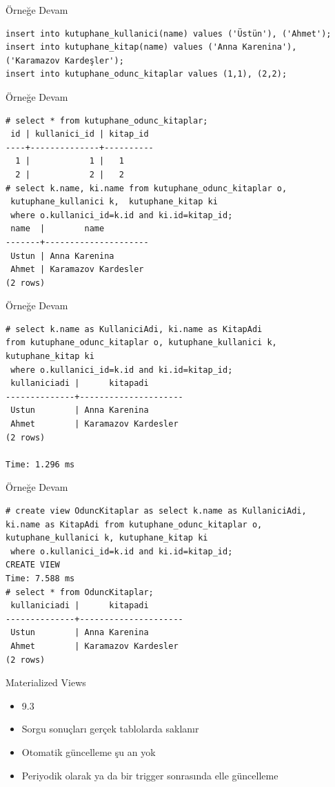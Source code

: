 \documentclass[presentation]{beamer}
\begin{document}
\begin{frame}[fragile,label=sec-32]{Örneğe Devam}
 \begin{verbatim}
insert into kutuphane_kullanici(name) values ('Üstün'), ('Ahmet');
insert into kutuphane_kitap(name) values ('Anna Karenina'), ('Karamazov Kardeşler');
insert into kutuphane_odunc_kitaplar values (1,1), (2,2);
\end{verbatim}
\end{frame}

\begin{frame}[fragile,label=sec-33]{Örneğe Devam}
 \begin{verbatim}
# select * from kutuphane_odunc_kitaplar;
 id | kullanici_id | kitap_id
----+--------------+----------
  1 |            1 |   1
  2 |            2 |   2
# select k.name, ki.name from kutuphane_odunc_kitaplar o,
 kutuphane_kullanici k,  kutuphane_kitap ki
 where o.kullanici_id=k.id and ki.id=kitap_id;
 name  |        name
-------+---------------------
 Ustun | Anna Karenina
 Ahmet | Karamazov Kardesler
(2 rows)
\end{verbatim}
\end{frame}

\begin{frame}[fragile,label=sec-34]{Örneğe Devam}
 \begin{verbatim}
# select k.name as KullaniciAdi, ki.name as KitapAdi
from kutuphane_odunc_kitaplar o, kutuphane_kullanici k, kutuphane_kitap ki
 where o.kullanici_id=k.id and ki.id=kitap_id;
 kullaniciadi |      kitapadi
--------------+---------------------
 Ustun        | Anna Karenina
 Ahmet        | Karamazov Kardesler
(2 rows)

Time: 1.296 ms
\end{verbatim}
\end{frame}

\begin{frame}[fragile,label=sec-35]{Örneğe Devam}
 \begin{verbatim}
# create view OduncKitaplar as select k.name as KullaniciAdi,
ki.name as KitapAdi from kutuphane_odunc_kitaplar o,
kutuphane_kullanici k, kutuphane_kitap ki
 where o.kullanici_id=k.id and ki.id=kitap_id;
CREATE VIEW
Time: 7.588 ms
# select * from OduncKitaplar;
 kullaniciadi |      kitapadi
--------------+---------------------
 Ustun        | Anna Karenina
 Ahmet        | Karamazov Kardesler
(2 rows)
\end{verbatim}
\end{frame}

\begin{frame}[label=sec-36]{Materialized Views}
\begin{itemize}
\item 9.3
\item Sorgu sonuçları gerçek tablolarda saklanır
\item Otomatik güncelleme şu an yok
\item Periyodik olarak ya da bir trigger sonrasında elle güncelleme
\end{itemize}
\end{frame}
\end{document}
